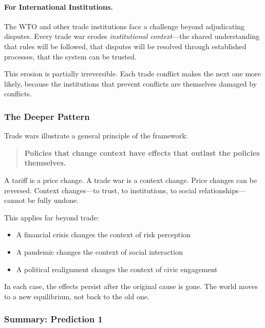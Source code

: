 \paragraph{For International Institutions.}
The WTO and other trade institutions face a challenge beyond adjudicating 
disputes. Every trade war erodes \emph{institutional context}---the shared 
understanding that rules will be followed, that disputes will be resolved 
through established processes, that the system can be trusted.

This erosion is partially irreversible. Each trade conflict makes the next 
one more likely, because the institutions that prevent conflicts are 
themselves damaged by conflicts.

\subsubsection{The Deeper Pattern}

Trade wars illustrate a general principle of the framework:

\begin{quote}
\textbf{Policies that change context have effects that outlast the policies themselves.}
\end{quote}

A tariff is a price change. A trade war is a context change. Price changes 
can be reversed. Context changes---to trust, to institutions, to social 
relationships---cannot be fully undone.

This applies far beyond trade:
\begin{itemize}
    \item A financial crisis changes the context of risk perception
    \item A pandemic changes the context of social interaction
    \item A political realignment changes the context of civic engagement
\end{itemize}

In each case, the effects persist after the original cause is gone. 
The world moves to a new equilibrium, not back to the old one.

\subsubsection{Summary: Prediction 1}

